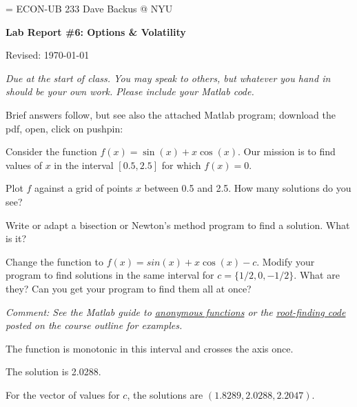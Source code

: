 \documentclass[11pt]{exam}
\begin{document}
\parskip=\bigskipamount
\parindent=0.0in
\thispagestyle{empty}
{\large ECON-UB 233 \hfill Dave Backus @ NYU}

\bigskip\bigskip
\centerline{\Large \bf Lab Report \#6: Options \& Volatility}
\centerline{Revised: \today}

\bigskip
{\it Due at the start of class.
You may speak to others, but whatever you hand in should be your own work.
Please include your Matlab code.
}

\begin{solution}
Brief answers follow,
but see also the attached Matlab program;
download the pdf, open, click on pushpin:
\end{solution}


\begin{questions}
Consider the function $f(x) = \sin(x) + x \cos(x) $.
Our mission is to find values of $x$ in the interval $[0.5, 2.5]$ for which $f(x) = 0$.
%
\begin{parts}
\item Plot $f$ against  a grid of points $x$ between 0.5 and 2.5.
How many solutions do you see?
\item Write or adapt a bisection or Newton's method program to find a solution.
What is it?
\item Change the function to $f(x) = sin(x) + x \cos(x) - c$.
Modify your program to find solutions in the same interval
for $ c = \{ 1/2, 0, -1/2 \} $.
What are they?
Can you get your program to find them all at once?
\end{parts}
{\it Comment: See the
Matlab guide to
\href{http://www.mathworks.com/help/matlab/matlab_prog/anonymous-functions.html}{anonymous functions}
or the
\href{http://pages.stern.nyu.edu/~dbackus/233/root_finding_pjb.m}{root-finding code}
posted on the course outline for examples.
}

\begin{solution}
\begin{parts}
\item The function is monotonic in this interval
and crosses the axis once.
\item The solution is 2.0288.
\item For the vector of values for $c$,
the solutions are $( 1.8289, 2.0288, 2.2047)$.
\end{parts}
\end{solution}


\end{questions}
\end{document}
